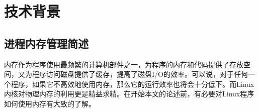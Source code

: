 
\chapter{技术背景}
\label{chap:RL}
\section{进程内存管理简述}
内存作为程序使用最频繁的计算机部件之一，为程序的内存和代码提供了存放空间，又为程序访问磁盘提供了缓存，提高了磁盘I/O的效率。可以说，对于任何一个程序，如果它不高效地使用内存，那么它的运行效率也将会十分低下。而Linux内核\cite{linux}对物理内存的利用更是精益求精。在开始本文的论述前，有必要对Linux程序如何使用内存有大致的了解。
